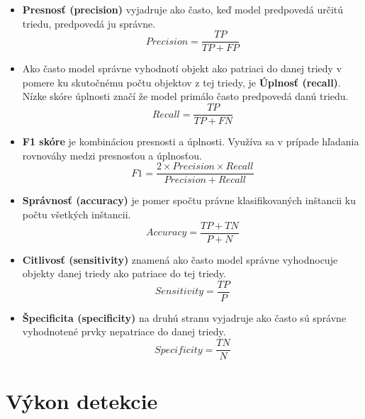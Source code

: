             \begin{itemize}
                \item \textbf{Presnosť (precision)} vyjadruje ako často, keď model predpovedá určitú triedu, predpovedá ju správne.
                \begin{equation}
                    Precision = \frac{TP}{TP + FP}
                \end{equation}
                \item Ako často model správne vyhodnotí objekt ako patriaci do danej triedy v pomere ku skutočnému počtu objektov z tej triedy, je \textbf{Úplnosť (recall)}. Nízke skóre úplnosti značí že model primálo často predpovedá danú triedu.
                \begin{equation}
                    Recall = \frac{TP}{TP + FN}
                \end{equation}
                \item \textbf{F1 skóre} je kombináciou presnosti a úplnosti. Využíva sa v prípade hľadania rovnováhy medzi presnosťou a úplnosťou.
                \begin{equation}
                    F1 = \frac{2 \times Precision \times Recall}{Precision + Recall}
                \end{equation}
                \item \textbf{Správnosť (accuracy)} je pomer spočtu právne klasifikovaných inštancii ku počtu všetkých inštancii.
                \begin{equation}
                    Accuracy = \frac{TP + TN}{P + N}
                \end{equation}
                \item \textbf{Citlivosť (sensitivity)} znamená ako často model správne vyhodnocuje objekty danej triedy ako patriace do tej triedy.
                \begin{equation}
                    Sensitivity = \frac{TP}{P}
                \end{equation}
                \item \textbf{Špecificita (specificity)} na druhú stranu vyjadruje ako často sú správne vyhodnotené prvky nepatriace do danej triedy.
                \begin{equation}
                    Specificity = \frac{TN}{N}
                \end{equation}
            \end{itemize}

    \section{Výkon detekcie}
